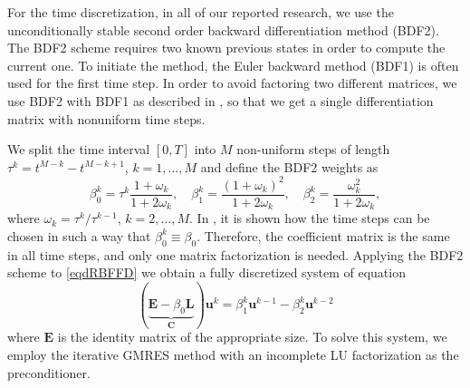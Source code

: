 \documentclass{UUThesisTemplate}
\begin{document}
\par
For the time discretization, in all of our reported research, we use the unconditionally stable second order backward differentiation method (BDF2). The BDF2 scheme requires two known previous states in order to compute the current one. To initiate the method, the Euler backward method (BDF1) is often used for the first time step. In order to avoid factoring two different matrices, we use BDF2 with BDF1 as described in \cite{larsson2008multi}, so that we get a single differentiation matrix with nonuniform time steps.

\par
We split the time interval $[0,T]$ into $M$ non-uniform steps of length $\tau^{k} = t^{M-k}-t^{M-k+1}$, $k = 1,\ldots,M$ and define the BDF2 weights as
%
\begin{equation}
\beta_0^k = \tau^k\frac{1+\omega_k}{1+2\omega_k},\quad
\beta_1^k = \frac{(1+\omega_k)^2}{1+2\omega_k},\quad
\beta_2^k = \frac{\omega_k^2}{1+2\omega_k},
\end{equation}
%
where $\omega_k=\tau^k/\tau^{k-1}$, $k=2,\ldots,M$. In \cite{larsson2008multi}, it is shown how the time steps can be chosen in such a way that $\beta_0^k\equiv \beta_0$. Therefore, the coefficient matrix is the same in all time steps, and only one matrix factorization is needed. Applying the BDF2 scheme to \eqref{eqdRBFFD} we obtain a fully discretized system of equation
\begin{equation}
(\underbrace{\mathbf{E}-\beta_0 \mathbf{L}}_{\mathbf{C}})
\mathbf{u}^k
= \beta_1^k\mathbf{u}^{k-1} - \beta_2^k\mathbf{u}^{k-2}
\label{impl:system}
\end{equation}
where $\mathbf{E}$ is the identity matrix of the appropriate size. To solve this system, we employ the iterative GMRES method with an incomplete LU factorization as the preconditioner.
\end{document}
